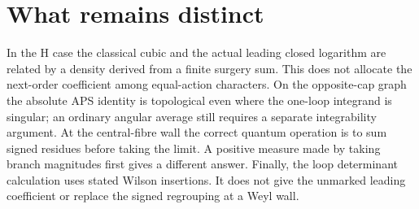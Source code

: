 \documentclass[11pt]{article}
\theoremstyle{remark}\newtheorem{remark}[theorem]{Remark}
\begin{document}




\section{What remains distinct}

In the H case the classical cubic and the actual leading closed logarithm are related by a density derived from a finite surgery sum. This does not allocate the next-order coefficient among equal-action characters. On the opposite-cap graph the absolute APS identity is topological even where the one-loop integrand is singular; an ordinary angular average still requires a separate integrability argument. At the central-fibre wall the correct quantum operation is to sum signed residues before taking the limit. A positive measure made by taking branch magnitudes first gives a different answer. Finally, the loop determinant calculation uses stated Wilson insertions. It does not give the unmarked leading coefficient or replace the signed regrouping at a Weyl wall.
\end{document}
